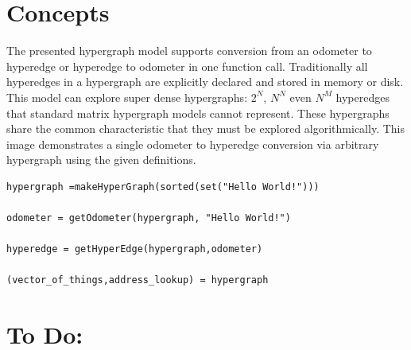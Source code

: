 \documentclass[12pt]{article}
\begin{document}
\section{Concepts}

\indent The presented hypergraph model supports conversion from an odometer to hyperedge or hyperedge to odometer in one function call. Traditionally all hyperedges in a hypergraph are explicitly declared and stored in memory or disk. \\

This model can explore super dense hypergraphs: $2^N$, $N^N$ even $N^M$ hyperedges that standard matrix hypergraph models cannot represent. These hypergraphs share the common characteristic that they must be explored algorithmically. This image demonstrates a single odometer to hyperedge conversion via arbitrary hypergraph using the given definitions.\\

\begin{lstlisting}
hypergraph =makeHyperGraph(sorted(set("Hello World!")))

odometer = getOdometer(hypergraph, "Hello World!")

hyperedge = getHyperEdge(hypergraph,odometer)

(vector_of_things,address_lookup) = hypergraph
\end{lstlisting}

\newpage
\section{To Do:}\label{results}
\end{document}
